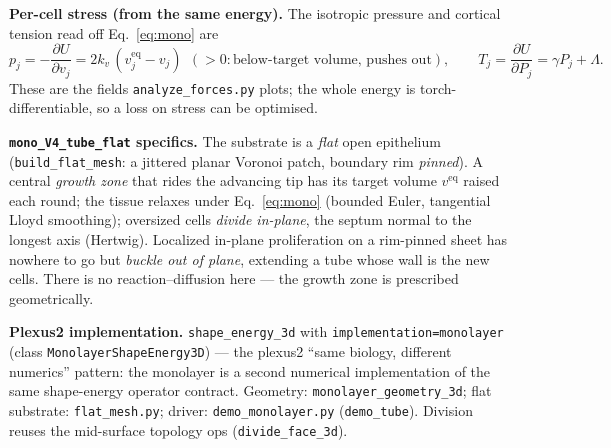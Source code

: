 \documentclass[11pt]{article}
\begin{document}
\textbf{Per-cell stress (from the same energy).} The isotropic pressure and cortical tension read off Eq.~\ref{eq:mono} are
\begin{equation}
p_j=-\frac{\partial U}{\partial v_j}=2k_v\,(v_j^{\text{eq}}-v_j)\ \ (>0:\text{below-target volume, pushes out}),
\qquad
T_j=\frac{\partial U}{\partial P_j}=\gamma P_j+\Lambda .
\end{equation}
These are the fields \texttt{analyze\_forces.py} plots; the whole energy is torch-differentiable, so a loss
on stress can be optimised.

\textbf{\texttt{mono\_V4\_tube\_flat} specifics.} The substrate is a \emph{flat} open epithelium
(\texttt{build\_flat\_mesh}: a jittered planar Voronoi patch, boundary rim \emph{pinned}). A central
\emph{growth zone} that rides the advancing tip has its target volume $v^{\text{eq}}$ raised each round; the
tissue relaxes under Eq.~\ref{eq:mono} (bounded Euler, tangential Lloyd smoothing); oversized cells
\emph{divide in-plane}, the septum normal to the longest axis (Hertwig). Localized in-plane proliferation on
a rim-pinned sheet has nowhere to go but \emph{buckle out of plane}, extending a tube whose wall is the new
cells. There is no reaction--diffusion here --- the growth zone is prescribed geometrically.

\textbf{Plexus2 implementation.} \texttt{shape\_energy\_3d} with \texttt{implementation=monolayer}
(class \texttt{MonolayerShapeEnergy3D}) --- the plexus2 ``same biology, different numerics'' pattern: the
monolayer is a second numerical implementation of the same shape-energy operator contract. Geometry:
\texttt{monolayer\_geometry\_3d}; flat substrate: \texttt{flat\_mesh.py}; driver: \texttt{demo\_monolayer.py}
(\texttt{demo\_tube}). Division reuses the mid-surface topology ops (\texttt{divide\_face\_3d}).
\end{document}

